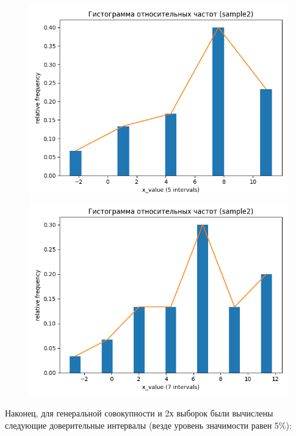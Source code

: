 \begin{figure}[H]
\begin{minipage}[H]{0.45\linewidth}
		\begin{center}
			\includegraphics[width=\linewidth]{figures/rel_freq_hist_5_bins_sample2}
		\end{center}
	\end{minipage}
	\hfill
	\begin{minipage}[H]{0.45\linewidth}
		\begin{center}
			\includegraphics[width=\linewidth]{figures/rel_freq_hist_7_bins_sample2}
		\end{center}
	\end{minipage}
\end{figure}

Наконец, для генеральной совокупности и 2х выборок были вычислены следующие доверительные интервалы (везде уровень значимости равен 5\%):


